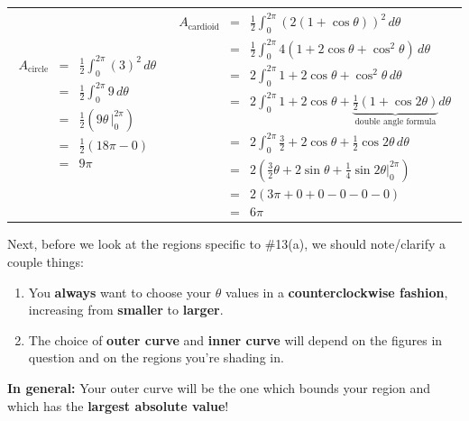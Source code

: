\documentclass[12pt]{article}
\begin{document}
	\begin{tabular}{C{2.75in}C{2.75in}}
	$$\begin{array}{rcl}
		A_{\text{circle}} & = &\frac{1}{2}\int_0^{2\pi}(3)^2\,d\theta\\[6mm]
			& = & \frac{1}{2}\int_0^{2\pi}9\,d\theta\\[6mm]
			& = & \frac{1}{2}\left(9\theta\,\Big|_0^{2\pi}\right)\\[6mm]
			& = & \frac{1}{2}\left(18\pi-0\right)\\[6mm]
			& = & 9\pi\\[1.75in]
		\end{array}$$
	&
	$$\begin{array}{rcl}
		A_{\text{cardioid}} & = & \frac{1}{2} \int_0^{2\pi}\left(2(1+\cos{\theta})\right)^2\,d\theta\\[6mm]
		& = & \frac{1}{2} \int_0^{2\pi}4(1+2\cos{\theta}+\cos^2{\theta})\,d\theta\\[6mm]
		& = & 2\int_0^{2\pi} 1 + 2\cos{\theta}+\cos^2{\theta}\,d\theta\\[6mm]
		& = &  2\int_0^{2\pi}1+2\cos\theta+\underbrace{\frac{1}{2}(1+\cos{2\theta})}_{\text{double angle formula}}d\theta\\[6mm]
		& = & 2\int_0^{2\pi} \frac{3}{2}+2\cos{\theta}+\frac{1}{2}\cos{2\theta}\,d\theta\\[6mm]
		& = & 2\left(\frac{3}{2}\theta + 2\sin\theta +\frac{1}{4}\sin{2\theta}\Bigg|_0^{2\pi}\right)\\[7.5mm]
		& = & 2\left(3\pi + 0 + 0 - 0 - 0 - 0\right)\\[6mm]
		& = & 6\pi
	\end{array}$$
	\end{tabular}

	\noindent Next, before we look at the regions specific to \#13(a), we should note/clarify a couple things:
	\begin{enumerate}
		\item You \textbf{always} want to choose your $\theta$ values in a \textbf{counterclockwise fashion}, increasing from \textbf{smaller} to \textbf{larger}.
		\item The choice of \textbf{outer curve} and \textbf{inner curve} will depend on the figures in question and on the regions you're shading in. 
	\end{enumerate}

	\begin{tcolorbox}[enhanced,colback=white,colframe=black,boxrule=0.5pt,arc=0pt,top=3mm,bottom=3mm]
		\noindent{} 
		
		\vspace{3mm}
		
		\textbf{In general:} Your outer curve will be the one which bounds your region and which has the \textbf{largest absolute value}!
	\end{tcolorbox}
\end{document}
